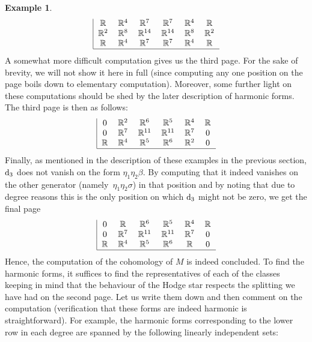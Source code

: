 \documentclass[pdftex]{sigma}
\numberwithin{equation}{section}
\theoremstyle{definition}
\newtheorem{egg}[tw]{Example}
\begin{document}
\begin{egg}
\[\begin{tabular}{|c c c c c c}
$\mathbb{R}$ & $\mathbb{R}^4$ & $\mathbb{R}^7$&$\mathbb{R}^7$& $\mathbb{R}^4$&$\mathbb{R}$\\
$\mathbb{R}^2$ & $\mathbb{R}^{8}$ & $\mathbb{R}^{14}$&$\mathbb{R}^{14}$& $\mathbb{R}^{8}$&$\mathbb{R}^2$\\
$\mathbb{R}$ & $\mathbb{R}^4$ & $\mathbb{R}^7$&$\mathbb{R}^7$& $\mathbb{R}^4$&$\mathbb{R}$
\\\hline
\end{tabular}\]
A somewhat more difficult computation gives us the third page. For the sake of brevity, we will not show it here in full (since computing any one position on the page boils down to elementary computation). Moreover, some further light on these computations should be shed by the later description of harmonic forms. The third page is then as follows:
\[\begin{tabular}{|c c c c c c}
$0$ & $\mathbb{R}^2$ & $\mathbb{R}^6$&$\mathbb{R}^5$& $\mathbb{R}^4$&$\mathbb{R}$\\
$0$ & $\mathbb{R}^{7}$ & $\mathbb{R}^{11}$&$\mathbb{R}^{11}$& $\mathbb{R}^{7}$&$0$\\
$\mathbb{R}$ & $\mathbb{R}^4$ & $\mathbb{R}^5$&$\mathbb{R}^6$& $\mathbb{R}^2$&$0$
\\\hline
\end{tabular}\]
Finally, as mentioned in the description of these examples in the previous section, ${\rm d}_3$ does not vanish on the form $\eta_1\eta_2\beta$. By computing that it indeed vanishes on the other generator (namely~$\eta_1\eta_2\sigma$) in that position and by noting that due to degree reasons this is the only position on which ${\rm d}_3$ might not be zero, we get the final page
\[\begin{tabular}{|c c c c c c}
$0$ & $\mathbb{R}$ & $\mathbb{R}^6$&$\mathbb{R}^5$& $\mathbb{R}^4$&$\mathbb{R}$\\
$0$ & $\mathbb{R}^{7}$ & $\mathbb{R}^{11}$&$\mathbb{R}^{11}$& $\mathbb{R}^{7}$&$0$\\
$\mathbb{R}$ & $\mathbb{R}^4$ & $\mathbb{R}^5$&$\mathbb{R}^6$& $\mathbb{R}$&$0$
\\\hline
\end{tabular}\]
Hence, the computation of the cohomology of $M$ is indeed concluded. To find the harmonic forms, it suffices to find the representatives of each of the classes keeping in mind that the behaviour of the Hodge star respects the splitting we have had on the second page. Let us write them down and then comment on the computation (verification that these forms are indeed harmonic is straightforward). For example, the harmonic forms corresponding to the lower row in each degree are spanned by the following linearly independent sets:

\end{egg}
\end{document}
